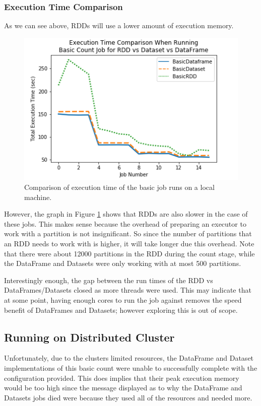 \documentclass[conference]{IEEEtran}
\begin{document}
\subsubsection{Execution Time Comparison}
As we can see above, RDDs will use a lower amount of execution memory.
\begin{figure}
    \includegraphics[width=\linewidth]{../python_scripts/images/basicJobAllExecutionTime.png}
    \caption{Comparison of execution time of the basic job runs on a local machine.}
    \label{fig:basicJobAllExecutionTime}
\end{figure}

However, the graph in Figure \ref{fig:basicJobAllExecutionTime} shows that RDDs are also slower in the case of these jobs.
This makes sense because the overhead of preparing an executor to work with a partition is not insignificant.
So since the number of partitions that an RDD needs to work with is higher, it will take longer due this overhead.
Note that there were about 12000 partitions in the RDD during the count stage, while the DataFrame and Datasets were only working with at most 500 partitions.

Interestingly enough, the gap between the run times of the RDD vs DataFrames/Datasets closed as more threads were used.
This may indicate that at some point, having enough cores to run the job against removes the speed benefit of DataFrames and Datasets; however exploring this is out of scope.

\subsection{Running on Distributed Cluster}
Unfortunately, due to the clusters limited resources, the DataFrame and Dataset implementations of this basic count were unable to successfully complete with the configuration provided.
This does implies that their peak execution memory would be too high since the message displayed as to why the DataFrame and Datasets jobs died were because they used all of the resources and needed more.
\end{document}
